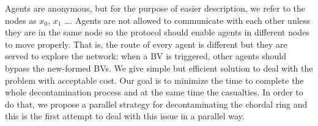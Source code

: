 Agents are anonymous, but for the purpose of easier description,  we refer to the nodes as $x_0$,  $x_1$ \dots.
Agents are not allowed to communicate with each other unless they are in the same node so the protocol should enable agents in different nodes to move properly. That is, the route of every agent is different but they are served to explore the network; when a BV is triggered, other agents should bypass the new-formed BVs. We give simple but efficient solution to deal with the problem with acceptable cost. 
Our goal is to minimize the time to complete the whole decontamination process and at the same time the casualties. In order to do that, we propose a parallel strategy for decontaminating the chordal ring and this is the first attempt to deal with this issue in a parallel way. 
%
% 


